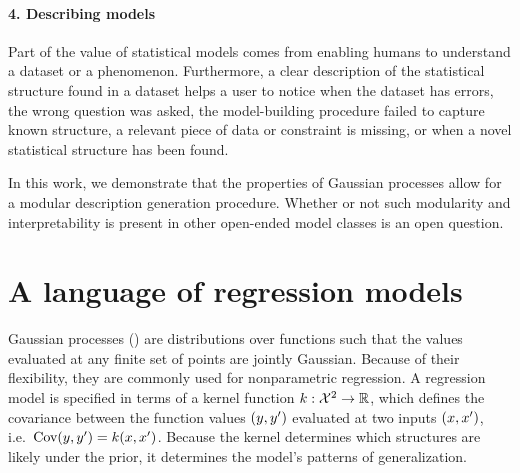 \documentclass[letterpaper]{article}
\def\ie{i.e.\ }
\begin{document}
\paragraph{4. Describing models}

Part of the value of statistical models comes from enabling humans to understand a dataset or a phenomenon.
Furthermore, a clear description of the statistical structure found in a dataset helps a user to notice when the dataset has errors, the wrong question was asked, the model-building procedure failed to capture known structure, a relevant piece of data or constraint is missing, or when a novel statistical structure has been found.

In this work, we 
demonstrate that the properties of Gaussian processes allow for a modular description generation procedure.
Whether or not such modularity and interpretability is present in other open-ended model classes is an open question.

\fi

\section{A language of regression models}
\label{sec:improvements}




Gaussian processes (\gp{}) \citep{rasmussen38gaussian} are distributions over functions such that the values evaluated at any finite set of points are jointly Gaussian.
Because of their flexibility, they are commonly used for nonparametric regression.
A \gp{} regression model is specified in terms of a kernel function ${k : \mathcal{X}^2 \to \mathbb{R}}$, which defines the covariance between the function values $(y, y')$ evaluated at two inputs $(x,x')$, \ie ${\textrm{Cov}(y, y') = k(x,x')}$.
Because the kernel determines which structures are likely under the \gp{} prior, it determines the model's patterns of generalization.
\end{document}
